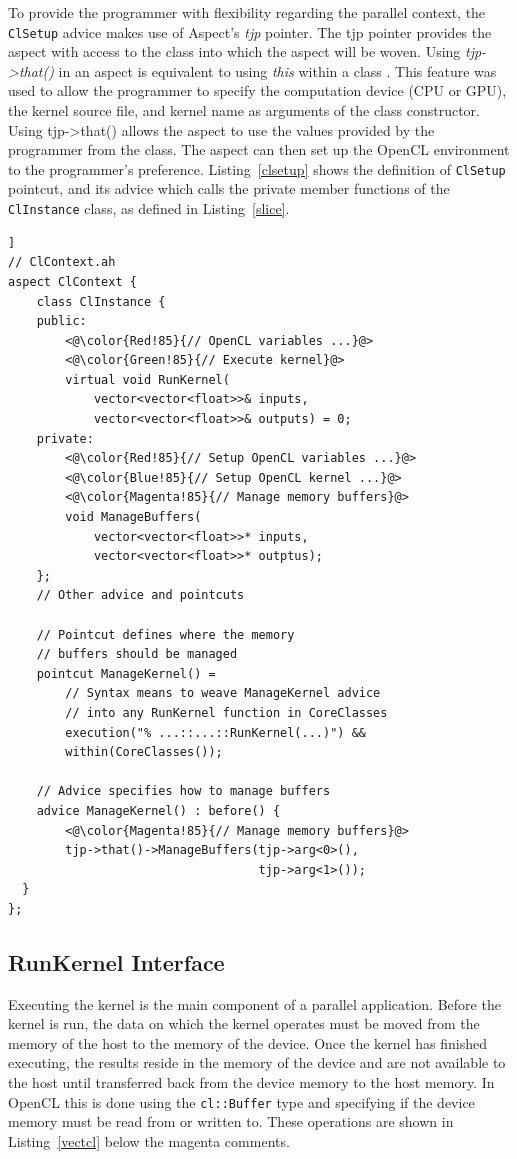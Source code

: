 \documentclass{sig-alternate-05-2015}
\begin{document}
To provide the programmer with flexibility regarding the parallel context,
the \lstinline$ClSetup$ advice makes use of Aspect\CPP's \textit{tjp} pointer. 
The tjp pointer provides the aspect with access to the \CPP class 
into which the aspect will be woven. Using \textit{tjp->that()} in an aspect 
is equivalent to using \textit{this} within a \CPP class . This feature was used 
to allow the programmer to specify the computation device (CPU or GPU), the 
kernel source file, and kernel name as arguments of the \CPP class constructor. 
Using tjp->that() allows the aspect to use the values provided by the 
programmer from the \CPP class. The aspect can then set up the OpenCL environment
to the programmer's preference.
Listing~\ref{clsetup} shows the definition of \lstinline$ClSetup$ pointcut, and its 
advice which calls the private member functions of the \lstinline$ClInstance$
class, as defined in Listing~\ref{slice}.

\begin{lstlisting}[caption=Abstract aspect components which hide kernel
cross-cutting concerns.,label=runkernel,float=[!t]]
// ClContext.ah
aspect ClContext {
	class ClInstance {
	public:
		<@\color{Red!85}{// OpenCL variables ...}@>
		<@\color{Green!85}{// Execute kernel}@>
		virtual void RunKernel(
			vector<vector<float>>& inputs,
			vector<vector<float>>& outputs) = 0;
	private:
		<@\color{Red!85}{// Setup OpenCL variables ...}@>
		<@\color{Blue!85}{// Setup OpenCL kernel ...}@>
		<@\color{Magenta!85}{// Manage memory buffers}@>
		void ManageBuffers(
			vector<vector<float>>* inputs,
			vector<vector<float>>* outptus);
	};
	// Other advice and pointcuts 

	// Pointcut defines where the memory 
	// buffers should be managed
	pointcut ManageKernel() = 
		// Syntax means to weave ManageKernel advice 
		// into any RunKernel function in CoreClasses 
		execution("% ...::...::RunKernel(...)") &&
		within(CoreClasses());

	// Advice specifies how to manage buffers
	advice ManageKernel() : before() {
		<@\color{Magenta!85}{// Manage memory buffers}@>
		tjp->that()->ManageBuffers(tjp->arg<0>(),
								   tjp->arg<1>());
  }
};
\end{lstlisting}

\subsection{RunKernel Interface}

Executing the kernel is the main component of a parallel application. Before the
kernel is run, the data on which the kernel operates must be moved from the
memory of the host to the memory of the device. Once the
kernel has finished executing, the results reside in the memory of the
device and are not available to the host until transferred
back from the device memory to the host memory. In OpenCL this
is done using the \lstinline$cl::Buffer$ type and specifying if the device memory
must be read from or written to. These operations are shown in Listing~\ref{vectcl} 
below the magenta comments. 
\end{document}
